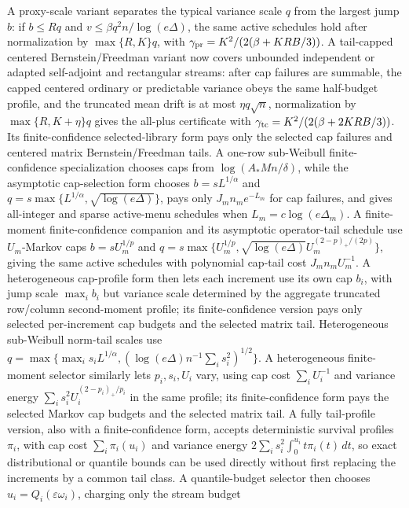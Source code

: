 \documentclass[11pt]{article}
\begin{document}
A proxy-scale variant separates the typical variance scale \(q\) from the
largest jump \(b\): if \(b\le Rq\) and
\(v\le\beta q^2n/\log(e\Delta)\), the same active schedules hold after
normalization by \(\max\{R,K\}q\), with
\(\gamma_{\rm pr}=K^2/(2(\beta+KRB/3))\).
A tail-capped centered Bernstein/Freedman variant now covers unbounded
independent or adapted self-adjoint and rectangular streams: after cap failures
are summable, the capped centered ordinary or predictable variance obeys the
same half-budget profile, and the truncated mean drift is at most
\(\eta q\sqrt n\), normalization by \(\max\{R,K+\eta\}q\) gives the
all-plus certificate with
\(\gamma_{\rm tc}=K^2/(2(\beta+2KRB/3))\).  Its finite-confidence selected-library
form pays only the selected cap failures and centered matrix
Bernstein/Freedman tails.
A one-row sub-Weibull finite-confidence specialization chooses caps from
\(\log(A_*Mn/\delta)\), while the asymptotic cap-selection form chooses
\(b=sL^{1/\alpha}\) and
\(q=s\max\{L^{1/\alpha},\sqrt{\log(e\Delta)}\}\), pays only
\(J_mn_m e^{-L_m}\) for cap failures, and gives all-integer and sparse
active-menu schedules when \(L_m=c\log(e\Delta_m)\).
A finite-moment finite-confidence companion and its asymptotic operator-tail
schedule use \(U_m\)-Markov caps
\(b=sU_m^{1/p}\) and
\(q=s\max\{U_m^{1/p},\sqrt{\log(e\Delta)}U_m^{(2-p)_+/(2p)}\}\), giving the
same active schedules with polynomial cap-tail cost \(J_mn_mU_m^{-1}\).
A heterogeneous cap-profile form then lets each increment use its own cap
\(b_i\), with jump scale \(\max_i b_i\) but variance scale determined by the
aggregate truncated row/column second-moment profile; its finite-confidence
version pays only selected per-increment cap budgets and the selected matrix
tail.  Heterogeneous
sub-Weibull norm-tail scales use
\(q=\max\{\max_i s_iL^{1/\alpha},
(\log(e\Delta)n^{-1}\sum_i s_i^2)^{1/2}\}\).
A heterogeneous finite-moment selector similarly lets \(p_i,s_i,U_i\) vary,
using cap cost \(\sum_iU_i^{-1}\) and variance energy
\(\sum_i s_i^2U_i^{(2-p_i)_+/p_i}\) in the same profile; its
finite-confidence form pays the selected Markov cap budgets and the selected
matrix tail.
A fully tail-profile version, also with a finite-confidence form, accepts
deterministic survival profiles \(\pi_i\), with cap cost
\(\sum_i\pi_i(u_i)\) and variance energy
\(2\sum_i s_i^2\int_0^{u_i}t\pi_i(t)\,dt\), so exact distributional or
quantile bounds can be used directly without first replacing the increments by
a common tail class.
A quantile-budget selector then chooses
\(u_i=Q_i(\varepsilon\omega_i)\), charging only the stream budget
\end{document}
